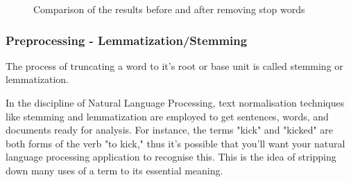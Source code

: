 \begin{figure}[H]
\caption{Comparison of the results before and after removing stop words }\label{stop_words_comparison}
\end{figure}

\subsubsection{Preprocessing - Lemmatization/Stemming}
The process of truncating a word to it's root or base unit is called stemming or lemmatization. 

In the discipline of Natural Language Processing, text normalisation techniques like stemming and lemmatization are employed to get sentences, words, and documents ready for analysis. For instance, the terms "kick" and "kicked" are both forms of the verb "to kick," thus it's possible that you'll want your natural language processing application to recognise this. This is the idea of stripping down many uses of a term to its essential meaning.

